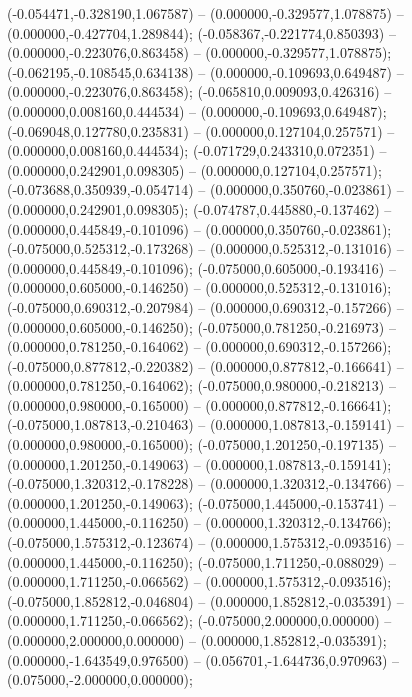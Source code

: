  (-0.054471,-0.328190,1.067587) -- (0.000000,-0.329577,1.078875) -- (0.000000,-0.427704,1.289844);
 (-0.058367,-0.221774,0.850393) -- (0.000000,-0.223076,0.863458) -- (0.000000,-0.329577,1.078875);
 (-0.062195,-0.108545,0.634138) -- (0.000000,-0.109693,0.649487) -- (0.000000,-0.223076,0.863458);
 (-0.065810,0.009093,0.426316) -- (0.000000,0.008160,0.444534) -- (0.000000,-0.109693,0.649487);
 (-0.069048,0.127780,0.235831) -- (0.000000,0.127104,0.257571) -- (0.000000,0.008160,0.444534);
 (-0.071729,0.243310,0.072351) -- (0.000000,0.242901,0.098305) -- (0.000000,0.127104,0.257571);
 (-0.073688,0.350939,-0.054714) -- (0.000000,0.350760,-0.023861) -- (0.000000,0.242901,0.098305);
 (-0.074787,0.445880,-0.137462) -- (0.000000,0.445849,-0.101096) -- (0.000000,0.350760,-0.023861);
 (-0.075000,0.525312,-0.173268) -- (0.000000,0.525312,-0.131016) -- (0.000000,0.445849,-0.101096);
 (-0.075000,0.605000,-0.193416) -- (0.000000,0.605000,-0.146250) -- (0.000000,0.525312,-0.131016);
 (-0.075000,0.690312,-0.207984) -- (0.000000,0.690312,-0.157266) -- (0.000000,0.605000,-0.146250);
 (-0.075000,0.781250,-0.216973) -- (0.000000,0.781250,-0.164062) -- (0.000000,0.690312,-0.157266);
 (-0.075000,0.877812,-0.220382) -- (0.000000,0.877812,-0.166641) -- (0.000000,0.781250,-0.164062);
 (-0.075000,0.980000,-0.218213) -- (0.000000,0.980000,-0.165000) -- (0.000000,0.877812,-0.166641);
 (-0.075000,1.087813,-0.210463) -- (0.000000,1.087813,-0.159141) -- (0.000000,0.980000,-0.165000);
 (-0.075000,1.201250,-0.197135) -- (0.000000,1.201250,-0.149063) -- (0.000000,1.087813,-0.159141);
 (-0.075000,1.320312,-0.178228) -- (0.000000,1.320312,-0.134766) -- (0.000000,1.201250,-0.149063);
 (-0.075000,1.445000,-0.153741) -- (0.000000,1.445000,-0.116250) -- (0.000000,1.320312,-0.134766);
 (-0.075000,1.575312,-0.123674) -- (0.000000,1.575312,-0.093516) -- (0.000000,1.445000,-0.116250);
 (-0.075000,1.711250,-0.088029) -- (0.000000,1.711250,-0.066562) -- (0.000000,1.575312,-0.093516);
 (-0.075000,1.852812,-0.046804) -- (0.000000,1.852812,-0.035391) -- (0.000000,1.711250,-0.066562);
 (-0.075000,2.000000,0.000000) -- (0.000000,2.000000,0.000000) -- (0.000000,1.852812,-0.035391);
 (0.000000,-1.643549,0.976500) -- (0.056701,-1.644736,0.970963) -- (0.075000,-2.000000,0.000000);
